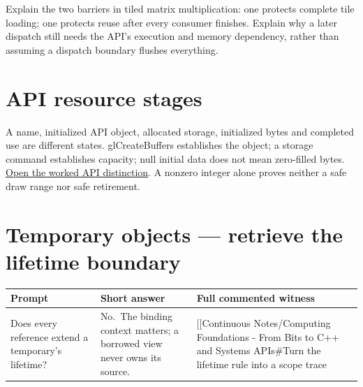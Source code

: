 Explain the two barriers in tiled matrix multiplication: one protects complete tile loading; one protects reuse after every consumer finishes. Explain why a later dispatch still needs the API's execution and memory dependency, rather than assuming a dispatch boundary flushes everything.

\section{API resource stages}\label{appendix-960160274237-api-resource-stages}

A name, initialized API object, allocated storage, initialized bytes and completed use are different states. glCreateBuffers establishes the object; a storage command establishes capacity; null initial data does not mean zero-filled bytes. \href{Continuous\%20Notes/Computing\%20Foundations\%20-\%20From\%20Bits\%20to\%20C++\%20and\%20Systems\%20APIs\#A\%20buffer\%20name,\%20an\%20API\%20object,\%20and\%20its\%20storage\%20are\%20separate}{Open the worked API distinction}. A nonzero integer alone proves neither a safe draw range nor safe retirement.

\section{Temporary objects --- retrieve the lifetime boundary}\label{appendix-960160274237-temporary-objects-retrieve-the-lifetime-boundary}

{\def\LTcaptype{none} %
\begin{longtable}[]{@{}
  >{\raggedright\arraybackslash}p{}
  >{\raggedright\arraybackslash}p{}
  >{\raggedright\arraybackslash}p{}@{}}
\toprule\noalign{}
\begin{minipage}[b]{\linewidth}\raggedright
Prompt
\end{minipage} & \begin{minipage}[b]{\linewidth}\raggedright
Short answer
\end{minipage} & \begin{minipage}[b]{\linewidth}\raggedright
Full commented witness
\end{minipage} \\
\midrule\noalign{}
\endhead
\bottomrule\noalign{}
\endlastfoot
Does every reference extend a temporary's lifetime? & No.~The binding context matters; a borrowed view never owns its source. & {[}{[}Continuous Notes/Computing Foundations - From Bits to C++ and Systems APIs\#Turn the lifetime rule into a scope trace \\
\end{longtable}
}
